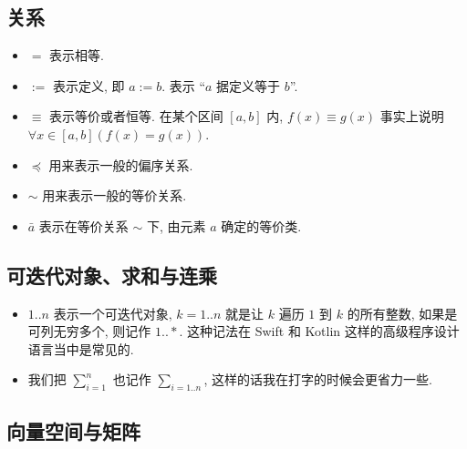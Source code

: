 \subsection*{关系}

\begin{itemize}
    \item $=$ 表示相等.
    \item $:=$ 表示定义, 即 $a := b$. 表示 “{\kaishu $a$ 据定义等于 $b$}”.
    \item $\equiv$ 表示等价或者恒等. 在某个区间 $[a, b]$ 内,
    $f(x) \equiv g(x)$ 事实上说明 $\forall x \in [a, b] \left(
        f(x) = g(x)
    \right)$.
    \item $\preceq$ 用来表示一般的偏序关系.
    \item $\sim$ 用来表示一般的等价关系.
    \item $\bar a$ 表示在等价关系 $\sim$ 下, 由元素 $a$ 确定的等价类.
\end{itemize}

\subsection*{可迭代对象、求和与连乘}


\begin{itemize}
    \item $1..n$ 表示一个可迭代对象, $k = 1..n$ 就是让 $k$ 遍历
    $1$ 到 $k$ 的所有整数, 如果是可列无穷多个, 则记作 $1..*$.
    这种记法在 Swift 和 Kotlin 这样的高级程序设计语言当中是常见的.
    \item 我们把 $\sum_{i=1}^n$ 也记作 $\sum_{i=1..n}$,
    这样的话我在打字的时候会更省力一些.
\end{itemize}

\subsection*{向量空间与矩阵}



